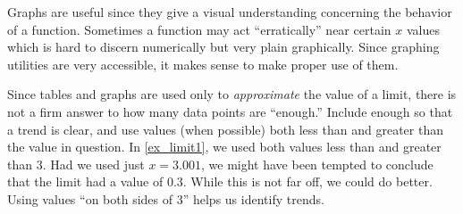 Graphs are useful since they give a visual understanding concerning the behavior of a function. Sometimes a function may act ``erratically'' near certain $x$ values which is hard to discern numerically but very plain graphically. Since graphing utilities are very accessible, it makes sense to make proper use of them.


Since tables and graphs are used only to \textit{approximate} the value of a limit, there is not a firm answer to how many data points are ``enough.'' Include enough so that a trend is clear, and use values (when possible) both less than and greater than the value in question. In \autoref{ex_limit1}, we used both values less than and greater than 3. Had we used just $x=3.001$, we might have been tempted to conclude that the limit had a value of $0.3$. While this is not far off, we could do better. Using values ``on both sides of 3'' helps us identify trends.



